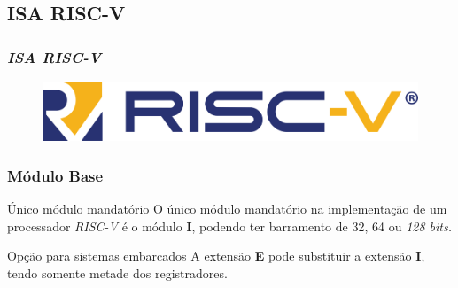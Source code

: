 \documentclass[aspectratio=169]{beamer}
\begin{document}
    \subsection{ISA RISC-V}
    \begin{frame}
        \vfill
        \frametitle{\textit{ISA RISC-V}}
        \begin{figure}[H]
        \centering
            \includegraphics[width=.8\textwidth,height=.8\textheight,keepaspectratio]
            {../images/riscv_logo.png}
        \end{figure}
        \vfill
    \end{frame}

    \begin{frame}
        \frametitle{Módulo Base}
        \vfill
        \begin{block}{Único módulo mandatório}
            { O único módulo mandatório na implementação de um processador \textit{RISC-V}
                é o módulo \textbf{I}, podendo ter barramento de 32, 64 ou \textit{128 bits.}
            }
        \end{block}
        \vfill
        \begin{exampleblock}{Opção para sistemas embarcados}
            { A extensão \textbf{E} pode substituir a extensão \textbf{I}, tendo somente metade
                dos registradores.
            }
        \end{exampleblock}
        \vfill
    \end{frame}
\end{document}
